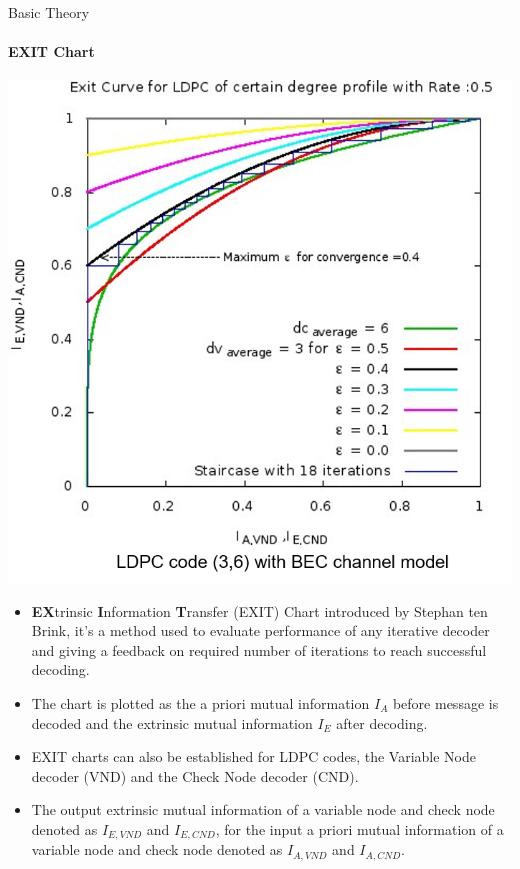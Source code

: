 \documentclass{beamer}
\begin{document}


\begin{frame}[shrink=34]{Basic Theory}
\framesubtitle{EXIT Chart}
\begin{multicols}{2}

  \null \vfill
  \includegraphics[scale=.6]{pict/lol.png}
  \vfill \null

\columnbreak

  \null \vfill
  \begin{itemize}
\justifying
\item \textbf{EX}trinsic \textbf{I}nformation \textbf{T}ransfer (EXIT) Chart introduced by Stephan ten Brink, it's a method used to evaluate performance of any iterative decoder and giving a feedback on required number of iterations to reach successful decoding\footnotemark[1].
\\
\item The chart is plotted as the a priori mutual information $I_A$ before message is decoded and the extrinsic mutual information $I_E$ after decoding.
\item EXIT charts can also be established for LDPC codes, the Variable Node decoder (VND) and the Check Node decoder (CND).
\item The output extrinsic mutual information of a variable node and check node denoted as $I_{E,VND}$ and $I_{E,CND}$, for the input a priori mutual information of a variable node and check node denoted as $I_{A,VND}$ and $I_{A,CND}$.
\end{itemize}
  

\end{multicols}
\end{frame}
\end{document}

